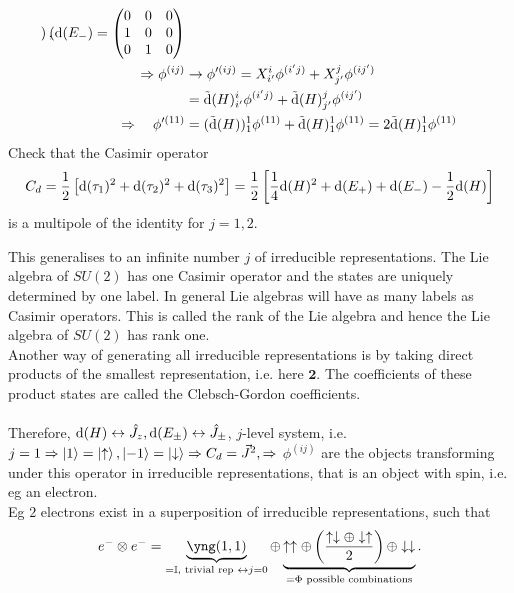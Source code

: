 \begin{enumerate}
\begin{align*}
\begin{pmatrix}
\end{pmatrix},
\mathrm{d}(E_-)=
\begin{pmatrix}
	0&0&0\\
	1&0&0\\
	0&1&0\\
\end{pmatrix}\\
\Rightarrow \phi^{(ij)} &\rightarrow \phi^{\prime (ij)}=X^i_{i^\prime} \phi^{(i^\prime j)} + X^j_{j^\prime} \phi^{(ij^\prime)} \\
&=\tilde{\mathrm{d}}(H)^i_{i^\prime} \phi^{(i^\prime j)} + \tilde{\mathrm{d}}(H)^j_{j^\prime} \phi^{(i j^\prime)} \\
\Rightarrow\quad \phi^{\prime (11)} &= (\tilde{\mathrm{d}}(H))^1_1\phi^{(11)} + \tilde{\mathrm{d}}(H)^1_1 \phi^{(11)} = 2 \tilde{\mathrm{d}}(H)^1_1\phi^{(11)}
 \end{align*}
Check that the Casimir operator
\begin{equation*}
	C_d=\frac{1}{2} \left[\mathrm{d}(\tau_1)^2+\mathrm{d}(\tau_2)^2+\mathrm{d}(\tau_3)^2\right]= \frac{1}{2} \left[\frac{1}{4} \mathrm{d}(H)^2+\mathrm{d}(E_+)+\mathrm{d}(E_-)-\frac{1}{2} \mathrm{d}(H)\right]
\end{equation*}
is a multipole of the identity for $j=1,2$.
\end{enumerate}
This generalises to an infinite number $j$ of irreducible representations. The Lie algebra of $SU (2)$ has one Casimir operator and the states
are uniquely determined by one label. In general Lie algebras will have as many labels as Casimir
operators. This is called the rank of the Lie algebra and hence the Lie algebra of $SU (2)$ has rank
one.\\
Another way of generating all irreducible representations is by taking direct products of the
smallest representation, i.e. here $\mathbf{2}$. The coefficients of these product states are called the Clebsch-Gordon coefficients.
\\
\\
Therefore, $\mathrm{d}(H)\leftrightarrow \hat{ J}_z, \mathrm{d}(E_\pm)\leftrightarrow\hat{ J}_\pm$, $j$-level system, i.e. $j=1 \Rightarrow \ket{1}=\ket{\uparrow},\ket{-1}=\ket{\downarrow}\Rightarrow C_d=\vec{J}^2, \Rightarrow$ $\phi^{(ij)}$ are the objects transforming under this operator in irreducible representations, that is an object with spin, i.e. eg an electron.\\
Eg $2$ electrons exist in a superposition of irreducible representations, such that
\begin{equation*}
	e^- \otimes e^- = \underbrace{\yng(1,1)}_{=\mI,\text{ trivial rep }  \leftrightarrow j=0}\oplus \underbrace{\uparrow\uparrow \oplus \left(\frac{\uparrow \downarrow\oplus \downarrow\uparrow}{2}\right) \oplus \downarrow\downarrow}_{=\Phi \text{ possible combinations}}.
\end{equation*}

